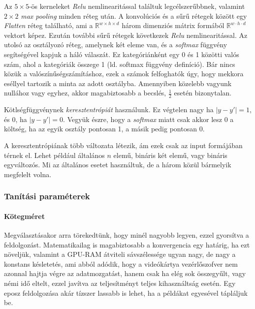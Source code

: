 Az $ 5 \times 5 $-ös kerneleket \textit{Relu} nemlinearitással találtuk legcélszerűbbnek,
valamint $ 2 \times 2 $ \textit{max pooling} minden réteg után.
A konvolúciós és a sűrű rétegek között egy \textit{Flatten} réteg található,
ami a $ \mathbb{R}^{w \times h \times d} $ három dimenziós mátrix formából 
$ \mathbb{R}^{w \cdot h \cdot d} $ vektort képez. Ezután további sűrű rétegek
következek \textit{Relu} nemlinearitással. Az utolsó az osztályozó
réteg, amelynek két eleme van, és a \textit{softmax} függvény segítségével kapjuk
a háló válaszát. Ez kategóriánként egy 0 és 1 közötti valós szám, ahol a kategóriák 
összege 1 (ld. softmax függvény definíció). Bár nincs közük a valószínűségszámításhoz, 
ezek a számok felfoghatók úgy, hogy mekkora eséllyel tartozik a minta az adott osztályba.
Amennyiben közelebb vagyunk nullához vagy egyhez, akkor magabiztosabb a becslés, 
$ \frac{1}{2} $ esetén bizonytalan.

Kötlségfüggvénynek \textit{keresztentrópiát} használunk. Ez végtelen nagy ha $ |y-y'|=1 $,
és 0, ha $ |y-y'|=0 $. Vegyük észre, hogy a \textit{softmax} miatt csak akkor lesz 0
a költség, ha az egyik osztály pontosan 1, a másik pedig pontosan 0.

A keresztentrópiának több változata létezik, ám ezek csak az input formájában térnek
el. Lehet például általános $ n $ elemű, bináris két elemű, vagy bináris egyváltozós.
Mi az általános esetet használtuk, de a három közül bármelyik megfelelt volna.


\subsubsection{Tanítási paraméterek}

\paragraph{Kötegméret}
Megválasztásakor arra törekedtünk, hogy minél nagyobb legyen, ezzel gyorsítva a feldolgozást.
Matematikailag is magabiztosabb a konvergencia egy határig, ha ezt növeljük, 
valamint a GPU-RAM átviteli sávszélessége ugyan nagy, de nagy a konstans késletetés, 
ami abból adódik, hogy a videókártya vezérlőszofver nem azonnal hajtja végre az adatmozgatást,
hanem csak ha elég sok összegyűlt, vagy némi idő eltelt, ezzel javítva az teljesítményt teljes 
kihasználtság esetén. Egy eposz feldolgozása akár tízszer lassabb is lehet, ha a példákat
egyesével tápláljuk be.





